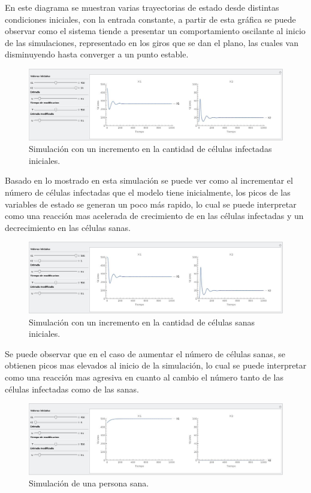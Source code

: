 \documentclass{article}
\begin{document}
En este diagrama se muestran varias trayectorias de estado desde distintas
condiciones iniciales, con la entrada constante, a partir de esta gráfica se
puede observar como el sistema tiende a presentar un comportamiento oscilante al
inicio de las simulaciones, representado en los giros que se dan el plano,
las cuales van disminuyendo hasta converger a un punto estable.

\begin{figure}[H]
    \includegraphics[width=\textwidth]{Images/Vih-more-infected.jpeg}
    \caption{Simulación con un incremento en la cantidad de células infectadas iniciales.}
\end{figure}

Basado en lo mostrado en esta simulación se puede ver como al incrementar el
número de células infectadas que el modelo tiene inicialmente, los picos de
las variables de estado se generan un poco más rapido, lo cual se puede interpretar como una
reacción mas acelerada de crecimiento de en las células infectadas y un
decrecimiento en las células sanas.

\begin{figure}[H]
    \includegraphics[width=\textwidth]{Images/Vih-more-healthy.jpeg}
    \caption{Simulación con un incremento en la cantidad de células sanas iniciales.}
\end{figure}

Se puede observar que en el caso de aumentar el número de células sanas, se obtienen
picos mas elevados al inicio de la simulación, lo cual se puede interpretar como
una reacción mas agresiva en cuanto al cambio el número tanto de las células infectadas
como de las sanas.

\begin{figure}[H]
    \includegraphics[width=\textwidth]{Images/Vih-healthy.jpeg}
    \caption{Simulación de una persona sana.}
\end{figure}
\end{document}
